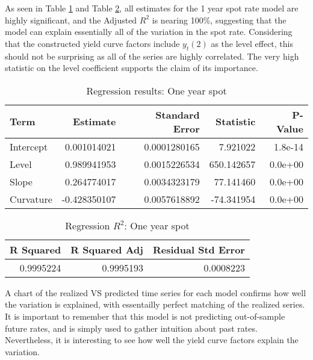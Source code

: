 \documentclass[openany]{book}
\theoremstyle{definition}
\theoremstyle{definition}
\theoremstyle{definition}
\theoremstyle{remark}
\begin{document}
As seen in Table \ref{tab:one-year-reg} and Table
\ref{tab:one-year-reg-r2}, all estimates for the 1 year spot rate model
are highly significant, and the Adjusted \(R^2\) is nearing 100\%,
suggesting that the model can explain essentially all of the variation
in the spot rate. Considering that the constructed yield curve factors
include \(y_t(2)\) as the level effect, this should not be surprising as
all of the series are highly correlated. The very high statistic on the
level coefficient supports the claim of its importance.

\small

\begin{table}[H]

\caption{\label{tab:one-year-reg}Regression results: One year spot}
\centering
\begin{tabular}[t]{lrrrr}
\toprule
Term & Estimate & Standard Error & Statistic & P-Value\\
\midrule
Intercept & 0.001014021 & 0.0001280165 & 7.921022 & 1.8e-14\\
Level & 0.989941953 & 0.0015226534 & 650.142657 & 0.0e+00\\
Slope & 0.264774017 & 0.0034323179 & 77.141460 & 0.0e+00\\
Curvature & -0.428350107 & 0.0057618892 & -74.341954 & 0.0e+00\\
\bottomrule
\end{tabular}
\end{table}

\normalsize

\small

\begin{table}[H]

\caption{\label{tab:one-year-reg-r2}Regression $R^2$: One year spot}
\centering
\begin{tabular}[t]{rrr}
\toprule
R Squared & R Squared Adj & Residual Std Error\\
\midrule
0.9995224 & 0.9995193 & 0.0008223\\
\bottomrule
\end{tabular}
\end{table}

\normalsize

A chart of the realized VS predicted time series for each model confirms
how well the variation is explained, with essentailly perfect matching
of the realized series. It is important to remember that this model is
not predicting out-of-sample future rates, and is simply used to gather
intuition about past rates. Nevertheless, it is interesting to see how
well the yield curve factors explain the variation.
\end{document}
